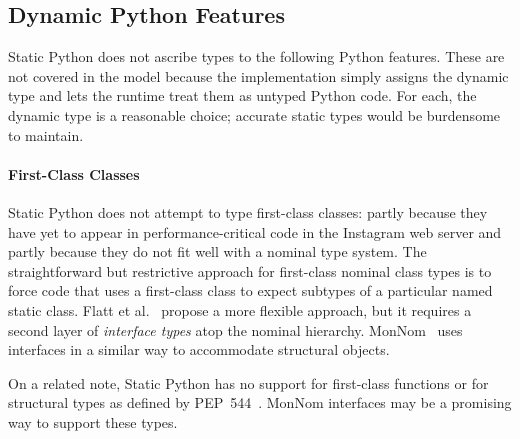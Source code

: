 \documentclass[english,cleveref,submission]{programming}
\newcommand{\SP}{Static Python}
\begin{document}
\subsection{Dynamic Python Features}
\label{s:dynamic-python}


\SP{} does not ascribe types to the following Python features.
These are not covered in the model because the implementation simply
assigns the dynamic type and lets the runtime treat them as untyped
Python code.
For each, the dynamic type is a reasonable choice;
accurate static types would be burdensome to maintain.


\paragraph{First-Class Classes}

\SP{} does not attempt to type first-class classes: partly because they have
yet to appear in performance-critical code in the Instagram web server
and partly because they do not fit well with a nominal type system.
The straightforward but restrictive approach for first-class nominal class types
is to force code that uses a first-class class to expect subtypes of a
particular named static class.
Flatt et al.~\cite{fkf-popl-1998} propose a more flexible approach, %
but it requires a second layer of \emph{interface types} atop the nominal hierarchy.
MonNom~\cite{mt-oopsla-2021} uses interfaces in a similar way to accommodate
structural objects.

On a related note, \SP{} has no support for first-class functions or for
structural types as defined by PEP~544~\cite{pep544}.
MonNom interfaces may be a promising way to support these types.


\end{document}
